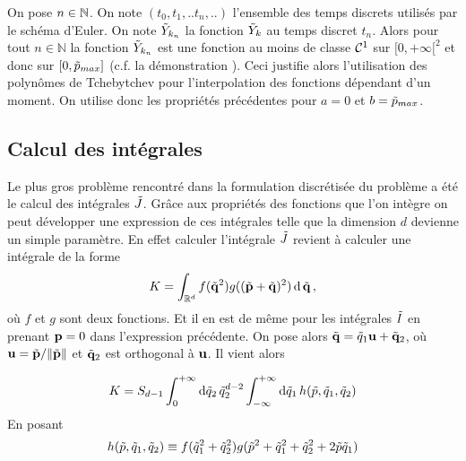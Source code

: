 \documentclass[10.5pt]{article}
\begin{document}
\begin{multicols*}{2}
On pose $n \in \mathbb{N}$. On note $(t_0, t_1, .. t_n, ..)$ l'ensemble des temps discrets utilisés par le schéma d'Euler. On note $\tilde{Y}_{k_n}$ la fonction $\tilde{Y}_k$ au temps discret $t_n$. Alors pour tout $n \in \mathbb{N}$ la fonction $\tilde{Y}_{k_n}$ est une fonction au moins de classe $\mathcal{C}^1$ sur $[0, +\infty[^2$ et donc sur $[0, \tilde{p}_{max}]$ (c.f. la démonstration ). Ceci justifie alors l'utilisation des polynômes de Tchebytchev pour l'interpolation des fonctions dépendant d'un moment. On utilise donc les propriétés précédentes pour $a=0$ et $b = \tilde{p}_{max}$. 

 \vspace*{11pt}

\subsection{Calcul des intégrales}

Le plus gros problème rencontré dans la formulation discrétisée du problème a été le calcul des intégrales $\tilde{J}$. 
Grâce aux propriétés des fonctions que l'on intègre on peut développer une expression de ces intégrales telle que la dimension $d$ devienne un simple paramètre. En effet calculer l'intégrale $\tilde{J}$ revient à calculer une intégrale de la forme 
\begin{equation}
K = \int_{\mathbb{R}^d} f(\tilde{{\bf q}}^2)g((\tilde{{\bf p}}+\tilde{{\bf q}})^2) \, \text{d} \, \tilde{{\bf q}} \, ,
\end{equation}
où $f$ et $g$ sont deux fonctions. Et il en est de même pour les intégrales $\tilde{I}$ en prenant ${\bf p} = 0$ dans l'expression précédente. On pose alors $\tilde{{\bf q}} = \tilde{q}_1 {\bf u} + \tilde{{\bf q}}_2$, où ${\bf u} = \tilde{{\bf p}}/\|\tilde{{\bf p}}\|$ et $\tilde{{\bf q}}_2$ est orthogonal à ${\bf u}$. Il vient alors

\begin{equation}
K = S_{d-1} \int_0^{+\infty} \text{d}\tilde{q}_2 \, \tilde{q}_2^{d-2} \int_{-\infty}^{+\infty} \text{d}\tilde{q}_1 \, h (\tilde{p}, \tilde{q}_1, \tilde{q}_2)
\end{equation}
En posant
\begin{equation}
h (\tilde{p}, \tilde{q}_1, \tilde{q}_2) \equiv f(\tilde{q}_1^2 + \tilde{q}_2^2) g(\tilde{p}^2 + \tilde{q}_1^2 + \tilde{q}_2^2 + 2\tilde{p}\tilde{q}_1)
\end{equation}


\end{multicols*}
\end{document}
